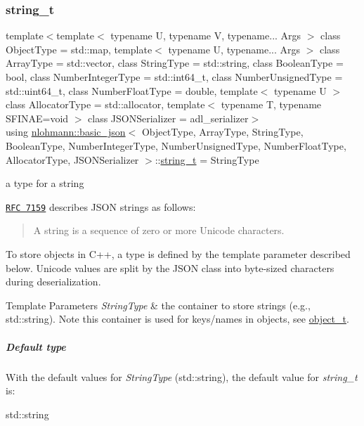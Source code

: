 \subsubsection{\texorpdfstring{string\+\_\+t}{string\_t}}
{\footnotesize\ttfamily template$<$template$<$ typename U, typename V, typename... Args $>$ class Object\+Type = std\+::map, template$<$ typename U, typename... Args $>$ class Array\+Type = std\+::vector, class String\+Type  = std\+::string, class Boolean\+Type  = bool, class Number\+Integer\+Type  = std\+::int64\+\_\+t, class Number\+Unsigned\+Type  = std\+::uint64\+\_\+t, class Number\+Float\+Type  = double, template$<$ typename U $>$ class Allocator\+Type = std\+::allocator, template$<$ typename T, typename S\+F\+I\+N\+A\+E=void $>$ class J\+S\+O\+N\+Serializer = adl\+\_\+serializer$>$ \\
using \mbox{\hyperlink{classnlohmann_1_1basic__json}{nlohmann\+::basic\+\_\+json}}$<$ Object\+Type, Array\+Type, String\+Type, Boolean\+Type, Number\+Integer\+Type, Number\+Unsigned\+Type, Number\+Float\+Type, Allocator\+Type, J\+S\+O\+N\+Serializer $>$\+::\mbox{\hyperlink{classnlohmann_1_1basic__json_a61f8566a1a85a424c7266fb531dca005}{string\+\_\+t}} =  String\+Type}



a type for a string 

\href{http://rfc7159.net/rfc7159}{\tt R\+FC 7159} describes J\+S\+ON strings as follows\+: \begin{quote}
A string is a sequence of zero or more Unicode characters. \end{quote}


To store objects in C++, a type is defined by the template parameter described below. Unicode values are split by the J\+S\+ON class into byte-\/sized characters during deserialization.


\begin{DoxyTemplParams}{Template Parameters}
{\em String\+Type} & the container to store strings (e.\+g., {\ttfamily std\+::string}). Note this container is used for keys/names in objects, see \mbox{\hyperlink{classnlohmann_1_1basic__json_a5e48a7893520e1314bf0c9723e26ea2a}{object\+\_\+t}}.\\
\hline
\end{DoxyTemplParams}
\subparagraph*{Default type}

With the default values for {\itshape String\+Type} ({\ttfamily std\+::string}), the default value for {\itshape string\+\_\+t} is\+:


\begin{DoxyCode}
std::string
\end{DoxyCode}


